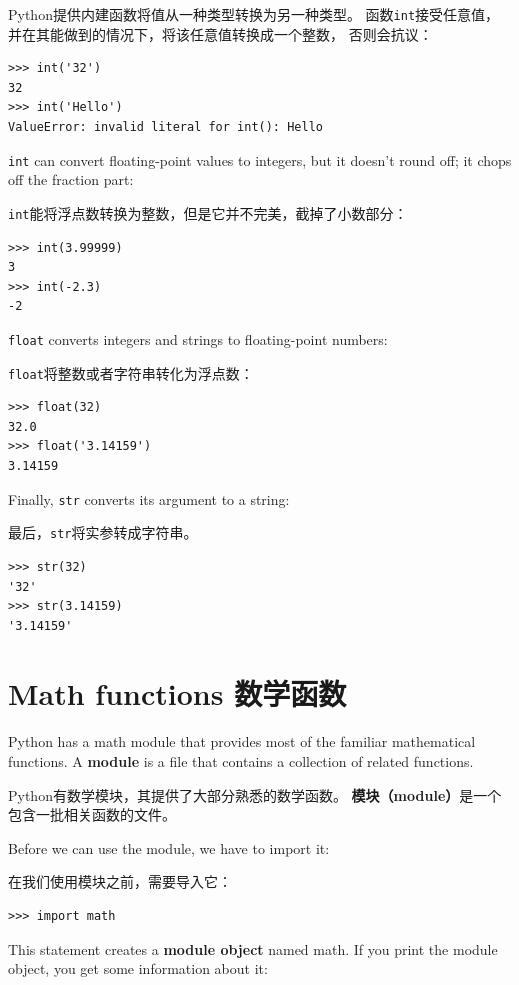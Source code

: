\documentclass[10pt]{book}
\begin{document}
\begin{CJK}{UTF8}{gbsn}
Python提供内建函数将值从一种类型转换为另一种类型。
函数{\tt int}接受任意值，并在其能做到的情况下，将该任意值转换成一个整数，
否则会抗议：

\begin{verbatim}
>>> int('32')
32
>>> int('Hello')
ValueError: invalid literal for int(): Hello
\end{verbatim}
%
{\tt int} can convert floating-point values to integers, but it
doesn't round off; it chops off the fraction part:

{\tt int}能将浮点数转换为整数，但是它并不完美，截掉了小数部分：

\begin{verbatim}
>>> int(3.99999)
3
>>> int(-2.3)
-2
\end{verbatim}
%
{\tt float} converts integers and strings to floating-point
numbers:

{\tt float}将整数或者字符串转化为浮点数：

\begin{verbatim}
>>> float(32)
32.0
>>> float('3.14159')
3.14159
\end{verbatim}
%
Finally, {\tt str} converts its argument to a string:

最后，{\tt str}将实参转成字符串。

\begin{verbatim}
>>> str(32)
'32'
>>> str(3.14159)
'3.14159'
\end{verbatim}
%



\section{Math functions 数学函数}

Python has a math module that provides most of the familiar
mathematical functions.  A {\bf module} is a file that contains a
collection of related functions.

Python有数学模块，其提供了大部分熟悉的数学函数。
{\bf 模块（module）}是一个包含一批相关函数的文件。

Before we can use the module, we have to import it:

在我们使用模块之前，需要导入它：

\begin{verbatim}
>>> import math
\end{verbatim}
%
This statement creates a {\bf module object} named math.  If
you print the module object, you get some information about it:


\end{CJK}
\end{document}
